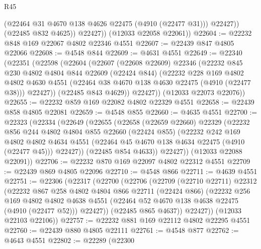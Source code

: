\begin{lexlean}{R45}
\begin{coremodule}
                (@22464 @31 @4670 @138 @4626 @22475 (@4910 (@22477 @31)))
                @22427))
            (@22485 @832 @4625))
          @22427))
      (@12033 @22058 @22061))
@22604 := @22232 @848 @169 @22067 @4802 @22346 @4551
@22607 := @22439 @847 @4805 @22066
@22608 := @4548 @844
@22609 := @4631 @4551
@22649 := @22340
    (@22351
      (@22598
        (@22604
          (@22607
            (@22608 @22609)
            @22346
            (@22232
              @845
              @230
              @4802
              @4804
              @844
              @22609
              (@22424 @844)
              (@22232
                @228
                @169
                @4802
                @4802
                @4630
                @4551
                (@22464 @38 @4670 @138 @4630 @22475 (@4910 (@22477 @38)))
                @22427))
            (@22485 @843 @4629))
          @22427))
      (@12033 @22073 @22076))
@22655 := @22232 @859 @169 @22082 @4802 @22329 @4551
@22658 := @22439 @858 @4805 @22081
@22659 := @4548 @855
@22660 := @4635 @4551
@22700 := @22323
    (@22334
      (@22649
        (@22655
          (@22658
            (@22659 @22660)
            @22329
            (@22232
              @856
              @244
              @4802
              @4804
              @855
              @22660
              (@22424 @855)
              (@22232
                @242
                @169
                @4802
                @4802
                @4634
                @4551
                (@22464 @45 @4670 @138 @4634 @22475 (@4910 (@22477 @45)))
                @22427))
            (@22485 @854 @4633))
          @22427))
      (@12033 @22088 @22091))
@22706 := @22232 @870 @169 @22097 @4802 @22312 @4551
@22709 := @22439 @869 @4805 @22096
@22710 := @4548 @866
@22711 := @4639 @4551
@22751 := @22306
    (@22317
      (@22700
        (@22706
          (@22709
            (@22710 @22711)
            @22312
            (@22232
              @867
              @258
              @4802
              @4804
              @866
              @22711
              (@22424 @866)
              (@22232
                @256
                @169
                @4802
                @4802
                @4638
                @4551
                (@22464 @52 @4670 @138 @4638 @22475 (@4910 (@22477 @52)))
                @22427))
            (@22485 @865 @4637))
          @22427))
      (@12033 @22103 @22106))
@22757 := @22232 @881 @169 @22112 @4802 @22295 @4551
@22760 := @22439 @880 @4805 @22111
@22761 := @4548 @877
@22762 := @4643 @4551
@22802 := @22289
    (@22300

\end{coremodule}
\end{lexlean}
